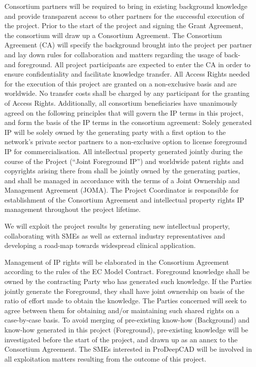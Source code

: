 Consortium partners will be required to bring in existing background knowledge and provide transparent access to other partners for the successful execution of the project.
Prior to the start of the project and signing the Grant Agreement, the consortium will draw up a Consortium Agreement.
The Consortium Agreement (CA) will specify the background brought into the project per partner and lay down rules for collaboration and matters regarding the usage of back- and foreground.
All project participants are expected to enter the CA in order to ensure confidentiality and facilitate knowledge transfer.
All Access Rights needed for the execution of this project are granted on a non-exclusive basis and are worldwide.
No transfer costs shall be charged by any participant for the granting of Access Rights.
Additionally, all consortium beneficiaries have unanimously agreed on the following principles that will govern the IP terms in this project, and form the basis of the IP terms in the consortium agreement: Solely generated IP will be solely owned by the generating party with a first option to the network’s private sector partners to a non-exclusive option to license foreground IP for commercialisation.
All intellectual property generated jointly during the course of the Project (``Joint Foreground IP'') and worldwide patent rights and copyrights arising there from shall be jointly owned by the generating parties, and shall be managed in accordance with the terms of a Joint Ownership and Management Agreement (JOMA).
The Project Coordinator is responsible for establishment of the Consortium Agreement and intellectual property rights IP management throughout the project lifetime.

We will exploit  the  project  results  by  generating  new  intellectual  property,  collaborating with SMEs as well as external industry representatives and developing a road-map towards widespread clinical application.

Management of IP rights will be elaborated in the Consortium Agreement according to the rules of the EC Model Contract.
Foreground knowledge shall be owned by the contracting Party who has generated such knowledge.
If the Parties jointly generate the Foreground, they shall have joint ownership on basis of the ratio of effort made to obtain the knowledge.
The Parties concerned will seek to agree between them for obtaining and/or maintaining such shared rights on a case-by-case basis.
To avoid merging of pre-existing know-how (Background) and know-how generated in this project (Foreground), pre-existing knowledge will be investigated before the start of the project, and drawn up as an annex to the Consortium Agreement.
The SMEs interested in ProDeepCAD will be involved in all exploitation matters resulting from the outcome of this project.

